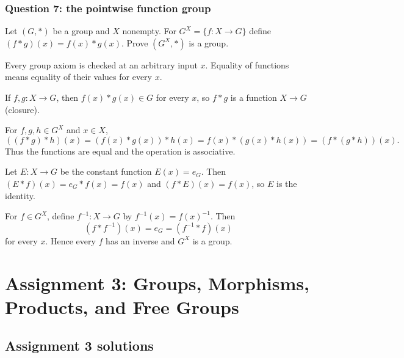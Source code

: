 \documentclass[11pt,openany]{book}
\begin{document}
\section{Question 7: the pointwise function group}
\begin{questionbox}
Let $(G,*)$ be a group and $X$ nonempty. For $G^X=\{f:X\to G\}$ define $(f*g)(x)=f(x)*g(x)$. Prove $(G^X,*)$ is a group.
\end{questionbox}
\begin{approachbox}
Every group axiom is checked at an arbitrary input $x$. Equality of functions means equality of their values for every $x$.
\end{approachbox}
\begin{solutionbox}
If $f,g:X\to G$, then $f(x)*g(x)\in G$ for every $x$, so $f*g$ is a function $X\to G$ (closure).

For $f,g,h\in G^X$ and $x\in X$,
\[
((f*g)*h)(x)=(f(x)*g(x))*h(x)
=f(x)*(g(x)*h(x))=(f*(g*h))(x).
\]
Thus the functions are equal and the operation is associative.

Let $E:X\to G$ be the constant function $E(x)=e_G$. Then
$(E*f)(x)=e_G*f(x)=f(x)$ and $(f*E)(x)=f(x)$, so $E$ is the identity.

For $f\in G^X$, define $f^{-1}:X\to G$ by $f^{-1}(x)=f(x)^{-1}$. Then
\[
(f*f^{-1})(x)=e_G=(f^{-1}*f)(x)
\]
for every $x$. Hence every $f$ has an inverse and $G^X$ is a group.
\end{solutionbox}


\part{Assignment 3: Groups, Morphisms, Products, and Free Groups}
\chapter{Assignment 3 solutions}
\end{document}
